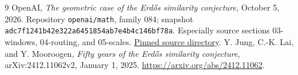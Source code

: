\documentclass[11pt]{article}
\theoremstyle{remark}\newtheorem{remark}[theorem]{Remark}
\begin{document}
\begin{thebibliography}{9}
 OpenAI, \emph{The geometric case of the Erd\H{o}s similarity conjecture}, October 5, 2026. Repository \texttt{openai/math}, family 084; snapshot \texttt{adc7f1241b42e322a6451854ab7e4b4c146bf78a}. Especially source sections 03-windows, 04-routing, and 05-scales. \href{https://github.com/openai/math/tree/adc7f1241b42e322a6451854ab7e4b4c146bf78a/preprints/The-geometric-case-of-the-Erdos-similarity-conjecture-October-5-2026}{Pinned source directory}.
 Y. Jung, C.-K. Lai, and Y. Mooroogen, \emph{Fifty years of the Erd\H{o}s similarity conjecture}, arXiv:2412.11062v2, January 1, 2025. \url{https://arxiv.org/abs/2412.11062}.
\end{thebibliography}
\end{document}
